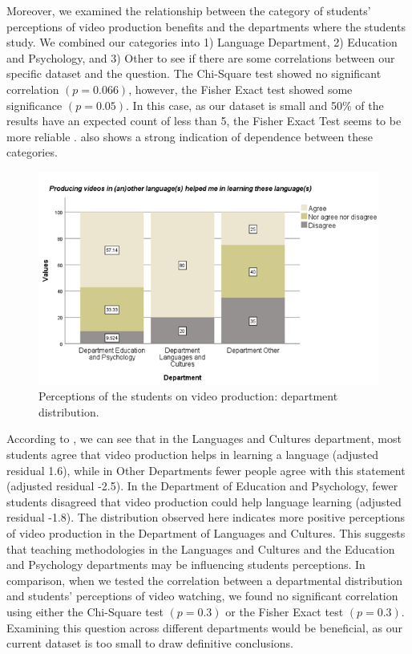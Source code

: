 Moreover, we examined the relationship between the category of students'
perceptions of video production benefits and the departments where the
students study. We combined our categories into 1) Language Department,
2) Education and Psychology, and 3) Other to see if there are some
correlations between our specific dataset and the question. The
Chi-Square test showed no significant correlation $(p= 0.066)$, however,
the Fisher Exact test showed some significance $(p = 0.05)$. In this case,
as our dataset is small and 50\% of the results have an expected count
of less than 5, the Fisher Exact Test seems to be more reliable \cite{jung2014}.
 also shows a strong indication of dependence between
these categories.

\begin{figure}[htbp]
\centering
\begin{minipage}{0.8\textwidth}
\includegraphics[width=\textwidth]{Fig-4.png}
\caption{Perceptions of the students on video production:
	department distribution.}
\label{fig-04}
\end{minipage}
\end{figure}

According to , we can see that in the Languages and Cultures
department, most students agree that video production helps in learning
a language (adjusted residual 1.6), while in Other Departments fewer
people agree with this statement (adjusted residual -2.5). In the
Department of Education and Psychology, fewer students disagreed that
video production could help language learning (adjusted residual -1.8).
The distribution observed here indicates more positive perceptions of
video production in the Department of Languages and Cultures. This
suggests that teaching methodologies in the Languages and Cultures and
the Education and Psychology departments may be influencing
students\textquotesingle{} perceptions. In comparison, when we tested the
correlation between a departmental distribution and students'
perceptions of video watching, we found no significant correlation using
either the Chi-Square test $(p=0.3)$ or the Fisher Exact test $(p=0.3)$.
Examining this question across different departments would be
beneficial, as our current dataset is too small to draw definitive
conclusions.

